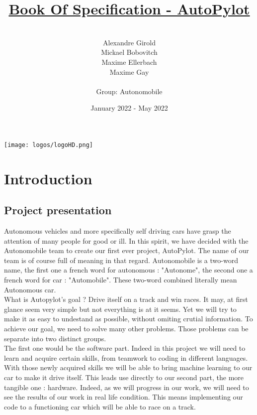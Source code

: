 \documentclass[12pt]{article}
\begin{document}
\title{\underline{Book Of Specification - AutoPylot}}
\date{January 2022 - May 2022}


\author{%
    \\
    Alexandre Girold\\
    Mickael Bobovitch \\
    Maxime Ellerbach \\
    Maxime Gay \\ \\
    Group: Autonomobile 
    }

\maketitle

\centerline{\texttt{[image: logos/logoHD.png]}}
\newpage

\tableofcontents
\newpage

\section{Introduction}

\subsection{Project presentation}
Autonomous vehicles and more specifically self driving cars have grasp the attention of many people for good or ill. In this spirit, we have decided with the Autonomobile team to create our first ever project, AutoPylot. The name of our team is of course full of meaning in that regard. Autonomobile is a two-word name, the first one a french word for autonomous : "Autonome", the second one a french word for car : "Automobile". These two-word combined literally mean Autonomous car.\\

What is Autopylot's goal ? 
Drive itself on a track and win races. It may, at first glance seem very simple but not everything is at it seems. Yet we will try to make it as easy to undestand as possible, without omiting crutial information. To achieve our goal, we need to solve many other problems. Those problems can be separate into two distinct groups. \\

The first one would be the software part. Indeed in this project we will need to learn and acquire certain skills, from teamwork to coding in different languages. With those newly acquired skills we will be able to bring machine learning to our car to make it drive itself. This leads use directly to our second part, the more tangible one : hardware. Indeed, as we will progress in our work, we will need to see the results of our work in real life condition. This means implementing our code to a functioning car which will be able to race on a track. \\
\end{document}
